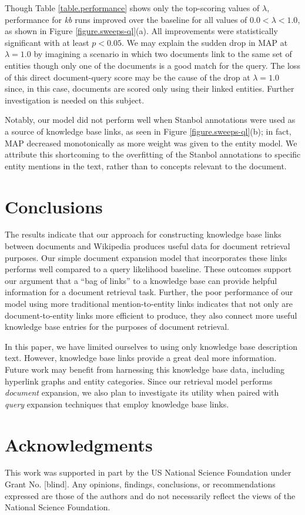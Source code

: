 \documentclass{sig-alternate}
\begin{document}
Though Table \ref{table.performance} shows only the top-scoring values of $\lambda$, performance for \textit{kb} runs improved over the baseline for all values of $0.0 < \lambda < 1.0$, as shown in Figure \ref{figure.sweeps-ql}(a). All improvements were statistically significant with at least $p < 0.05$. We may explain the sudden drop in MAP at $\lambda=1.0$ by imagining a scenario in which two documents link to the same set of entities though only one of the documents is a good match for the query. The loss of this direct document-query score may be the cause of the drop at $\lambda=1.0$ since, in this case, documents are scored only using their linked entities. Further investigation is needed on this subject.

Notably, our model did not perform well when Stanbol annotations were used as a source of knowledge base links, as seen in Figure \ref{figure.sweeps-ql}(b); in fact, MAP decreased monotonically as more weight was given to the entity model. We attribute this shortcoming to the overfitting of the Stanbol annotations to specific entity mentions in the text, rather than to concepts relevant to the document.

\section{Conclusions}\label{section.conclusions}

The results indicate that our approach for constructing knowledge base links between documents and Wikipedia produces useful data for document retrieval purposes. Our simple document expansion model that incorporates these links performs well compared to a query likelihood baseline. These outcomes support our argument that a ``bag of links'' to a knowledge base can provide helpful information for a document retrieval task. Further, the poor performance of our model using more traditional mention-to-entity links indicates that not only are document-to-entity links more efficient to produce, they also connect more useful knowledge base entries for the purposes of document retrieval.

In this paper, we have limited ourselves to using only knowledge base description text. However, knowledge base links provide a great deal more information. Future work may benefit from harnessing this knowledge base data, including hyperlink graphs and entity categories. Since our retrieval model performs \textit{document} expansion, we also plan to investigate its utility when paired with \textit{query} expansion techniques that employ knowledge base links.

\section{Acknowledgments}\label{section.acknowledgments}
This work was supported in part by the US National Science Foundation under Grant No. [blind]. Any opinions, findings, conclusions, or recommendations expressed are those of the authors and do not necessarily reflect the views of the National Science Foundation.



  
\end{document}
